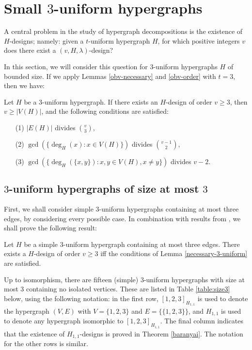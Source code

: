 \section{Small $3$-uniform hypergraphs}

A central problem in the study of hypergraph decompositions is the existence of
$H$-designs; namely: given a $t$-uniform hypergraph $H$, for which positive
integers $v$ does there exist a $(v, H, \lambda)$-design?

In this section, we will consider this question for $3$-uniform hypergraphs $H$ of bounded size.
If we apply Lemmas \ref{obv-necessary} and \ref{obv-order} with $t = 3$, then we have:

\begin{lemma} \label{necessary-3-uniform}
Let $H$ be a $3$-uniform hypergraph.
If there exists an $H$-design of order $v \geq 3$, then $v \geq |V(H)|$, and the following conditions are satisfied:
\begin{enumerate}
    \item[(1)] $|E(H)|$ divides ${v \choose 3}$,
    \item[(2)] $\gcd(\{\deg_H(x) : x \in V(H)\})$ divides ${v-1 \choose 2}$,
    \item[(3)] $\gcd(\{\deg_H(\{x,y\}) : x, y \in V(H), x \neq y\})$ divides $v-2$.
\end{enumerate}
\end{lemma}

\subsection{$3$-uniform hypergraphs of size at most $3$}

First, we shall consider simple $3$-uniform hypergraphs containing at most three edges, by considering every possible case.
In combination with results from \cite{baran, bryant, feng-chang2, hanani}, we shall prove the following result:

\begin{theorem}
Let $H$ be a simple $3$-uniform hypergraph containing at most three edges.
There exists a $H$-design of order $v \geq 3$ iff the conditions of Lemma \ref{necessary-3-uniform} are satisfied.
\end{theorem}

Up to isomorphism, there are fifteen (simple) $3$-uniform hypergraphs with size at most 3 containing no isolated vertices.
These are listed in Table \ref{table:size3} below, using the following notation: in the first row, $[1, 2, 3]_{H_{1,1}}$ is used to denote the hypergraph $(V, E)$ with $V = \{1, 2, 3\}$ and $E = \{\{1, 2, 3\}\}$, and $H_{1,1}$ is used to denote any hypergraph isomorphic to $[1, 2, 3]_{H_{1,1}}$.
The final column indicates that the existence of $H_{1,1}$-designs is proved in Theorem \ref{baranyai}.
The notation for the other rows is similar.

